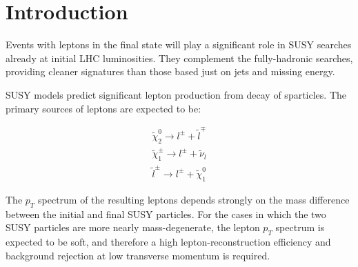 \documentclass{cmspaper}
\begin{document}
%
%
%
%
%
%

\section{Introduction}
\label{sec:intro}

Events with leptons in the final state will play a significant role in SUSY searches already at
initial LHC luminosities. They complement the fully-hadronic searches, providing cleaner signatures
than those based just on jets and missing energy.

SUSY models predict significant lepton production from decay of sparticles. The primary sources of
leptons are expected to be:

\begin{align*}
   \tilde{\chi}_2^0     \rightarrow l^{\pm} + \tilde{l}^{\mp} \\
   \tilde{\chi}_1^{\pm} \rightarrow l^{\pm} + \tilde{\nu}_l   \\
   \tilde{l}^{\pm}      \rightarrow l^{\pm} + \tilde{\chi}_1^0
\end{align*}

The $p_T$ spectrum of the resulting leptons depends strongly on the mass difference between the
initial and final SUSY particles. For the cases in which the two SUSY particles are more nearly
mass-degenerate, the lepton $p_T$ spectrum is expected to be soft, and therefore a high
lepton-reconstruction efficiency and background rejection at low transverse momentum is required.
\end{document}
